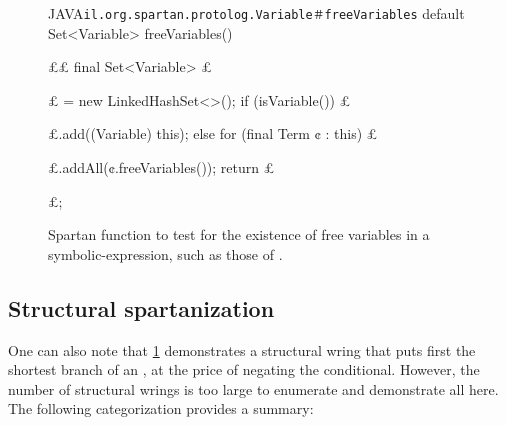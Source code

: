 \begin{figure}
  \caption{\label{figure:free}%
    Spartan function to test for the existence of free variables in a
    symbolic-expression, such as those of \protect\Prolog.
  }
\begin{Code}{JAVA}{\scriptsize\texttt{il.org.spartan.protolog.Variable＃freeVariables}}
default Set<Variable> freeVariables() {££
  final Set<Variable> £\ignore$£$ = new LinkedHashSet<>();
  if (isVariable())
   £\ignore$£$.add((Variable) this);
  else
    for (final Term ¢ : this)
     £\ignore$£$.addAll(¢.freeVariables());
  return £\ignore$£$;
}
\end{Code}
\end{figure}

\subsection{Structural spartanization}
\label{section:wrings}

\newlength{}

One can also note that \cref{figure:free} demonstrates
  a structural wring that puts first the shortest branch of
  an , at the price of negating the conditional.
However, the number of structural wrings is too large to enumerate and
demonstrate all here. The following categorization provides a summary:

